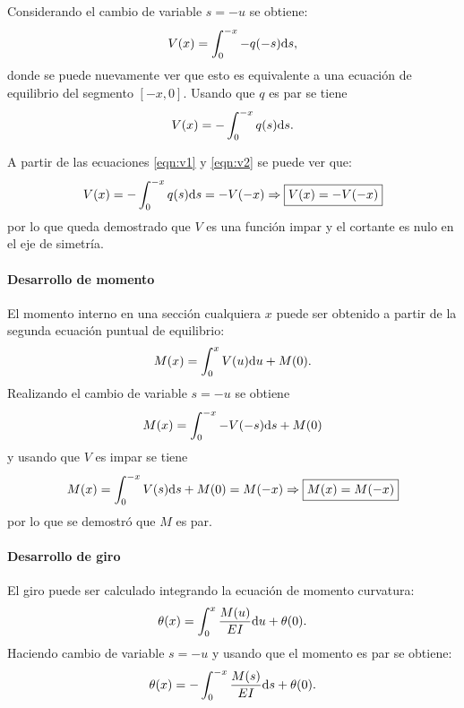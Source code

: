 Considerando el cambio de variable $s=-u$ se obtiene:
%
\begin{equation}
V(x) = \int_{0}^{-x} -q(-s) {\text{d}} s,
\end{equation}
%
donde se puede nuevamente ver que esto es equivalente a una ecuación de equilibrio del segmento $[-x,0]$. %
Usando que $q$ es par se tiene
\begin{equation}\label{eqn:v2}
V(x) = - \int_{0}^{-x} q(s) {\text{d}} s.
\end{equation}
%


A partir de las ecuaciones \eqref{eqn:v1} y \eqref{eqn:v2} se puede ver que:
%
\begin{equation}
V(x) = - \int_{0}^{-x} q(s) {\text{d}} s  = -V(-x)
\Rightarrow \boxed{
V(x) = -V(-x)}
\end{equation}
%
por lo que queda demostrado que $V$ es una función impar y el cortante es nulo en el eje de simetría.


\paragraph{Desarrollo de momento}
El momento interno en una sección cualquiera $x$ puede ser obtenido  a partir de la segunda ecuación puntual de equilibrio:
%
\begin{equation}
M(x) = \int_{0}^{x} V(u) {\text{d}} u + M(0).
\end{equation}
%
Realizando el cambio de variable $s=-u$ se obtiene
\begin{equation}
M(x) = \int_{0}^{-x} -V(-s) {\text{d}} s + M(0)
\end{equation}
%
y usando que $V$ es impar se tiene
\begin{equation}
M(x) = \int_{0}^{-x} V(s) {\text{d}} s + M(0) = M(-x)
\Rightarrow \boxed{
M(x) = M(-x)
}
\end{equation}
por lo que se demostró que $M$ es par.

\paragraph{Desarrollo de giro}
El giro puede ser calculado integrando la ecuación de momento curvatura:
%
\begin{equation}
\theta(x) = \int_{0}^{x} \frac{ M(u)}{EI} {\text{d}} u + \theta(0).
\end{equation}
%
Haciendo cambio de variable $s=-u$ y usando que el momento es par se obtiene:
\begin{equation}
\theta(x) = - \int_{0}^{-x} \frac{ M(s)}{EI} {\text{d}} s + \theta(0).
\end{equation}

